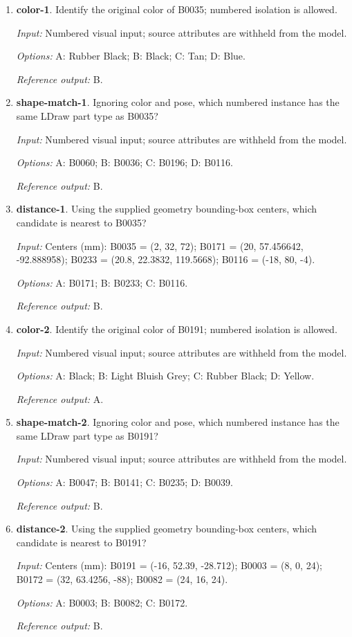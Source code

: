 \begin{enumerate}
\item \textbf{color-1}. Identify the original color of B0035; numbered isolation is allowed.\par {\small \textit{Input:} Numbered visual input; source attributes are withheld from the model. \par\textit{Options:} A: Rubber Black; B: Black; C: Tan; D: Blue. \par\textit{Reference output:} B.}
\item \textbf{shape-match-1}. Ignoring color and pose, which numbered instance has the same LDraw part type as B0035?\par {\small \textit{Input:} Numbered visual input; source attributes are withheld from the model. \par\textit{Options:} A: B0060; B: B0036; C: B0196; D: B0116. \par\textit{Reference output:} B.}
\item \textbf{distance-1}. Using the supplied geometry bounding-box centers, which candidate is nearest to B0035?\par {\small \textit{Input:} Centers (mm): B0035 = (2, 32, 72); B0171 = (20, 57.456642, -92.888958); B0233 = (20.8, 22.3832, 119.5668); B0116 = (-18, 80, -4). \par\textit{Options:} A: B0171; B: B0233; C: B0116. \par\textit{Reference output:} B.}
\item \textbf{color-2}. Identify the original color of B0191; numbered isolation is allowed.\par {\small \textit{Input:} Numbered visual input; source attributes are withheld from the model. \par\textit{Options:} A: Black; B: Light Bluish Grey; C: Rubber Black; D: Yellow. \par\textit{Reference output:} A.}
\item \textbf{shape-match-2}. Ignoring color and pose, which numbered instance has the same LDraw part type as B0191?\par {\small \textit{Input:} Numbered visual input; source attributes are withheld from the model. \par\textit{Options:} A: B0047; B: B0141; C: B0235; D: B0039. \par\textit{Reference output:} B.}
\item \textbf{distance-2}. Using the supplied geometry bounding-box centers, which candidate is nearest to B0191?\par {\small \textit{Input:} Centers (mm): B0191 = (-16, 52.39, -28.712); B0003 = (8, 0, 24); B0172 = (32, 63.4256, -88); B0082 = (24, 16, 24). \par\textit{Options:} A: B0003; B: B0082; C: B0172. \par\textit{Reference output:} B.}

\end{enumerate}
